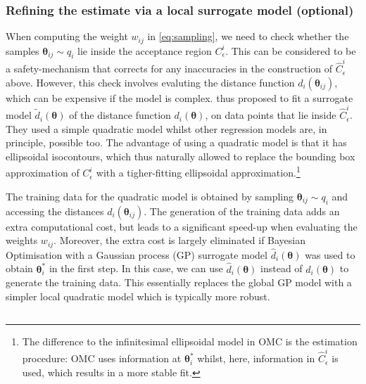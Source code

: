 \documentclass[article]{jss}
\newcommand{\thetab}{\boldsymbol{\theta}}
\newcommand{\accregioni}{C^i_{\epsilon}}
\newcommand{\accregionihat}{\hat{C}^i_{\epsilon}}
\begin{document}
\subsubsection*{Refining the estimate via a local surrogate model (optional)}
When computing the weight \(w_{ij}\) in \eqref{eq:sampling}, we need
to check whether the samples \(\thetab_{ij} \sim q_i\) lie inside the
acceptance region \(\accregioni\). This can be considered to be a
safety-mechanism that corrects for any inaccuracies in the
construction of \(\accregionihat\) above. However, this check involves
evaluting the distance function \(d_i(\thetab_{ij})\), which can be
expensive if the model is complex. \citet{Ikonomov2019} thus proposed
to fit a surrogate model \(\tilde{d}_i(\thetab)\) of the distance
function \(d_i(\thetab)\), on data points that lie inside
\(\accregionihat\). They used a simple quadratic model whilst other
regression models are, in principle, possible too. The advantage of
using a quadratic model is that it has ellipsoidal isocontours, which
thus naturally allowed \citet{Ikonomov2019} to replace the bounding
box approximation of \(\accregioni\) with a tigher-fitting ellipsoidal
approximation.\footnote{The difference to the infinitesimal
  ellipsoidal model in OMC is the estimation procedure: OMC uses
  information at \(\thetab_i^*\) whilst, here, information in
  \(\accregionihat\) is used, which results in a more stable fit.}

The training data for the quadratic model is obtained by sampling
\(\thetab_{ij} \sim q_i\) and accessing the distances
\(d_i(\thetab_{ij})\). The generation of the training data adds an
extra computational cost, but leads to a significant speed-up when
evaluating the weights \(w_{ij}\). Moreover, the extra cost is largely
eliminated if Bayesian Optimisation with a Gaussian process (GP)
surrogate model \(\hat{d}_i(\thetab)\) was used to obtain
\(\thetab_i^*\) in the first step. In this case, we can use
\(\hat{d}_i(\thetab)\) instead of \(d_i(\thetab)\) to generate the
training data. This essentially replaces the global GP model with a
simpler local quadratic model which is typically more robust.


\subsection[Engine for likelihood-free inference (ELFI)]{}
\label{subsec:ELFI}


\end{document}
